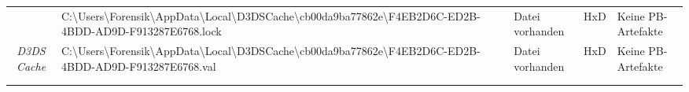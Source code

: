 \begin{appendices}
{\begin{landscape}
\begin{table}[h!]
{\begin{tabular}{cllll}
		\multicolumn{1}{|c|}{}                                                        & \multicolumn{1}{l|}{\cellcolor[HTML]{3190FF}C:\textbackslash{}Users\textbackslash{}Forensik\textbackslash{}AppData\textbackslash{}Local\textbackslash{}D3DSCache\textbackslash{}cb00da9ba77862e\textbackslash{}F4EB2D6C-ED2B-4BDD-AD9D-F913287E6768.lock}                                                                                                                       & \multicolumn{1}{l|}{\cellcolor[HTML]{009901}Datei vorhanden}                                      & \multicolumn{1}{l|}{HxD}                                   & \multicolumn{1}{l|}{\cellcolor[HTML]{F8A102}Keine PB-Artefakte} \\ \cline{2-5} 
		\multicolumn{1}{|c|}{\multirow{-3}{*}{\textit{D3DS Cache}}}                   & \multicolumn{1}{l|}{\cellcolor[HTML]{3190FF}C:\textbackslash{}Users\textbackslash{}Forensik\textbackslash{}AppData\textbackslash{}Local\textbackslash{}D3DSCache\textbackslash{}cb00da9ba77862e\textbackslash{}F4EB2D6C-ED2B-4BDD-AD9D-F913287E6768.val}                                                                                                                        & \multicolumn{1}{l|}{\cellcolor[HTML]{009901}Datei vorhanden}                                      & \multicolumn{1}{l|}{HxD}                                   & \multicolumn{1}{l|}{\cellcolor[HTML]{F8A102}Keine PB-Artefakte} \\ \hline
		\multicolumn{1}{l}{}                                                          &                                                                                                                                                                                                                                                                                                                                                                                 &                                                                                                   &                                                            &                                                                 \\
		\multicolumn{1}{l}{}                                                          &                                                                                                                                                                                                                                                                                                                                                                                 &                                                                                                   &                                                            &                                                                 \\

\end{tabular}}
\end{table}
\end{landscape}}
\end{appendices}
